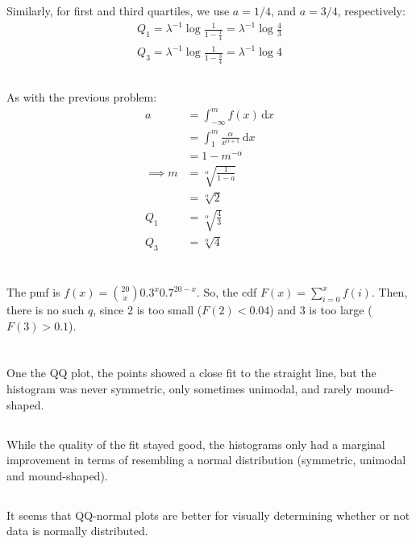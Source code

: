 \documentclass[twocolumn]{article}
\newcommand{\setsection}[1]{\setcounter{section}{#1}\addtocounter{section}{-1}\section{}}
\newcommand{\intg}[4]{\int_{#1}^{#2} \! #3 \, \mathrm{d}#4}
\begin{document}
Similarly, for first and third quartiles, we use $a=1/4$, and $a=3/4$, respectively:\begin{align*}
Q_1=\lambda^{-1}\log\frac{1}{1-\frac{1}{4}}=\lambda^{-1}\log\frac{4}{3}\\
Q_3=\lambda^{-1}\log\frac{1}{1-\frac{3}{4}}=\lambda^{-1}\log 4
\end{align*}

\subsection{}
As with the previous problem:\begin{align*}
a	& = \intg{-\infty}{m}{f(x)}{x}	\\
	&= \intg{1}{m}{\frac{\alpha }{x^{\alpha +1}}}{x} \\
	&= 1-m^{-\alpha}\\
\implies m &= \sqrt[\alpha]{\frac{1}{1-a}}\\
&= \sqrt[\alpha]{2} \\
Q_1 &= \sqrt[\alpha]{\frac{4}{3}}\\
Q_3 &= \sqrt[\alpha]{4}
\end{align*}

\setsection{13}
The pmf is $f(x)=\binom{20}{x}0.3^x0.7^{20-x}$. So, the cdf $F(x)=\sum_{i=0}^xf(i)$. Then, there is no such $q$, since 2 is too small ($F(2)<0.04$) and 3 is too large ($F(3)>0.1$).

\setsection{14}
\subsection{}
One the QQ plot, the points showed a close fit to the straight line, but the histogram was never symmetric, only sometimes unimodal, and rarely mound-shaped.
\subsection{}
While the quality of the fit stayed good, the histograms only had a marginal improvement in terms of resembling a normal distribution (symmetric, unimodal and mound-shaped).
\subsection{}
It seems that QQ-normal plots are better for visually determining whether or not data is normally distributed.
\end{document}
